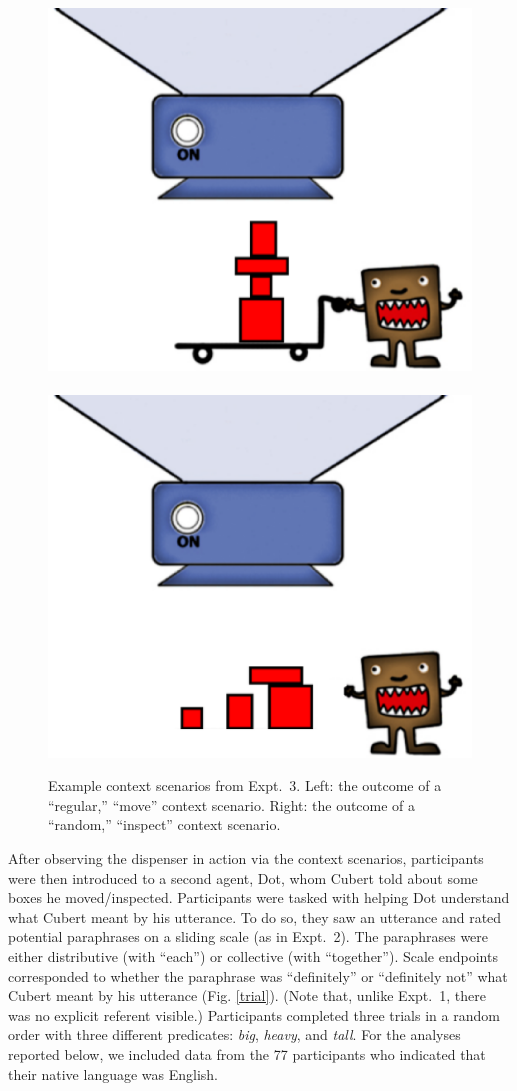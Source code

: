 \documentclass[linguex]{sp}
\newcommand{\ndg}[1]{\textcolor{Green}{[ndg: #1]}}
\begin{document}
\begin{figure}[h]
\centering
\includegraphics[width=.45\textwidth]{images/context13reg.eps}
\ \ \ \ 
\includegraphics[width=.45\textwidth]{images/context13nodolly.eps}
\caption{Example context scenarios from Expt.~3. Left: the outcome of a ``regular,'' ``move'' context scenario. Right: the outcome of a ``random,'' ``inspect'' context scenario.\label{expt2context}}
\end{figure}


After observing the dispenser in action via the context  scenarios, participants were then introduced to a second agent, Dot, whom Cubert told about some boxes he moved/inspected. Participants were tasked with helping Dot understand what Cubert meant by his utterance. To do so, they saw an utterance and rated potential paraphrases on a sliding scale (as in Expt.~2). The paraphrases were either distributive (with  ``each'') or collective (with ``together'').  Scale endpoints corresponded to whether the paraphrase was ``definitely'' or ``definitely not'' what Cubert meant by his utterance (Fig. \ref{trial}). (Note that, unlike Expt.~1, there was no explicit referent visible.) Participants completed three trials in a random order with three different predicates: \emph{big}, \emph{heavy}, and \emph{tall}. For the analyses reported below, we included data from the 77 participants who indicated that their native language was English.

\end{document}
